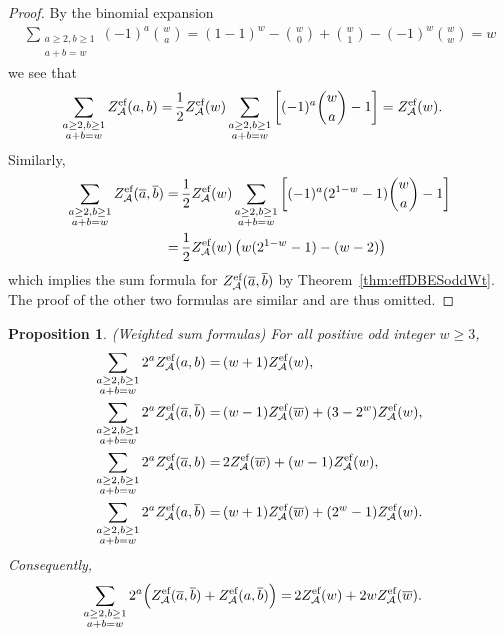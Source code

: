 \documentclass{article}
\newcommand{\calA}{\mathcal{A}}
\newcommand{\eff}{\text{\rm{ef}}}
\newcommand{\ol}{\overline}
\theoremstyle{plain}
\newtheorem{prop}[thm]{Proposition}
\theoremstyle{definition}
\begin{document}
\begin{proof}
By the binomial expansion
\begin{align*}
  \sum_{\substack{a\ge 2,b\ge 1\\ a+b=w}}  (-1)^a \binom{w}{a} =
  (1-1)^w-\binom{w}{0}+\binom{w}{1}-(-1)^w \binom{w}{w} =w
\end{align*}
we see that
\begin{align*}
  \sum_{\substack{a\ge 2,b\ge 1\\ a+b=w}}  Z_\calA^\eff(a,b)
  =&\, \frac12 Z_\calA^\eff(w)\sum_{\substack{a\ge 2,b\ge 1\\ a+b=w}}  \left[(-1)^a \binom{w}{a}-1\right]
  =Z_\calA^\eff(w).
\end{align*}
Similarly,
\begin{align*}
  \sum_{\substack{a\ge 2,b\ge 1\\ a+b=w}}  Z_\calA^\eff(\ol{a},\ol{b})
  =&\, \frac12 Z_\calA^\eff(w)\sum_{\substack{a\ge 2,b\ge 1\\ a+b=w}}  \left[(-1)^a (2^{1-w}-1)\binom{w}{a}-1 \right] \\
  =&\,  \frac12 Z_\calA^\eff(w)\left( w(2^{1-w}-1)-(w-2)  \right)
\end{align*}
which implies the sum formula for $Z_\calA^\eff(\ol{a},\ol{b})$ by Theorem~\ref{thm:effDBESoddWt}. The proof of the other two formulas are similar and are thus omitted.
\end{proof}

\begin{prop}\label{prop:WtSumFormula} \emph{(Weighted sum formulas)}
For all positive odd integer $w\ge 3$,
\begin{align}
  \sum_{\substack{a\ge 2,b\ge 1\\ a+b=w}} 2^a  Z_\calA^\eff(a,b)=&\, (w+1) Z_\calA^\eff(w), \label{equ:OddWtSum(a,b)}\\
  \sum_{\substack{a\ge 2,b\ge 1\\ a+b=w}} 2^a Z_\calA^\eff(\ol{a},\ol{b})=&\, (w-1)Z_\calA^\eff(\ol{w})+(3-2^w)Z_\calA^\eff(w),\label{equ:WtSum(bara,barb)}\\
  \sum_{\substack{a\ge 2,b\ge 1\\ a+b=w}} 2^a Z_\calA^\eff(\ol{a},b)=&\, 2Z_\calA^\eff(\ol{w}) + (w-1)Z_\calA^\eff(w),\notag \\
  \sum_{\substack{a\ge 2,b\ge 1\\ a+b=w}} 2^a Z_\calA^\eff(a,\ol{b})=&\, (w+1)Z_\calA^\eff(\ol{w})+(2^w-1)Z_\calA^\eff(w).\label{equ:WtSum(a,barb)}
\end{align}
Consequently,
\begin{align}\label{equ:WtSum(a,barb)AND(a,barb)}
\sum_{\substack{a\ge 2,b\ge 1\\ a+b=w}}  2^a \Big(Z_\calA^\eff(\ol{a},\ol{b})+ Z_\calA^\eff(a,\ol{b})\Big)
=&\,2 Z_\calA^\eff(w)+ 2w Z_\calA^\eff(\ol{w}).
\end{align}
\end{prop}
\end{document}
